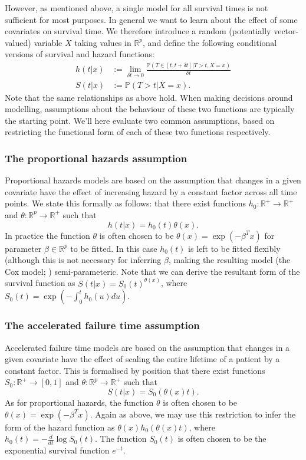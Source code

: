 \documentclass[../thesis.tex]{subfiles}
\begin{document}
However, as mentioned above, a single model for all survival times is not sufficient for most purposes. In general we want to learn about the effect of some covariates on survival time. We therefore introduce a random (potentially vector-valued) variable $X$ taking values in $\mathbb{R}^p$, and define the following conditional versions of survival and hazard functions:
\begin{align*}
    h(t|x) & := \lim_{\delta t \rightarrow 0} \frac{\mathbb{P}(T \in [t, t + \delta t] | T > t, X = x)}{\delta t} \\
    S(t|x) & := \mathbb{P}(T > t | X = x).
\end{align*}
Note that the same relationships as above hold. When making decisions around modelling, assumptions about the behaviour of these two functions are typically the starting point. We'll here evaluate two common assumptions, based on restricting the functional form of each of these two functions respectively.

\subsubsection{The proportional hazards assumption}
Proportional hazards models are based on the assumption that changes in a given covariate have the effect of increasing hazard by a constant factor across all time points. We state this formally as follows: that there exist functions $h_0: \mathbb{R}^+ \rightarrow \mathbb{R}^+$ and $\theta: \mathbb{R}^p \rightarrow \mathbb{R}^+$ such that 
\[h(t|x) = h_0(t) \theta(x). \]
In practice the function $\theta$ is often chosen to be $\theta(x) = \exp (- \beta^T x)$ for parameter $\beta \in \mathbb{R}^p$ to be fitted. In this case $h_0(t)$ is left to be fitted flexibly (although this is not necessary for inferring $\beta$, making the resulting model (the Cox model; \citealp{cox_regression_1972}) semi-parameteric. Note that we can derive the resultant form of the survival function as $S(t|x) = S_0(t)^{\theta(x)}$, where $S_0(t) = \exp(-\int_{0}^{t}h_0(u)du)$.


\subsubsection{The accelerated failure time assumption}
Accelerated failure time models \citep{wei_accelerated_1992} are based on the assumption that changes in a given covariate have the effect of scaling the entire lifetime of a patient by a constant factor. This is formalised by position that there exist functions $S_0: \mathbb{R}^+ \rightarrow [0,1]$ and $\theta: \mathbb{R}^p \rightarrow \mathbb{R}^+$ such that 
\[S(t|x) = S_0(\theta(x)t).\]
As for proportional hazards, the function $\theta$ is often chosen to be $\theta(x) = \exp (-\beta^T x)$. Again as above, we may use this restriction to infer the form of the hazard function as $\theta(x)h_0(\theta(x)t)$, where $h_0(t) = -\frac{d}{dt} \log S_0(t)$. The function $S_0(t)$ is often chosen to be the exponential survival function $e^{-t}$.
\end{document}

